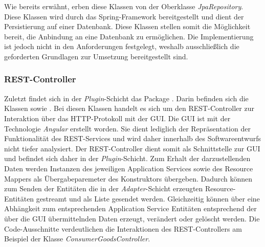Wie bereits erwähnt, erben diese Klassen von der Oberklasse \textit{JpaRepository}.
Diese Klassen wird durch das Spring-Framework bereitgestellt und dient der Persistierung auf einer Datenbank.
Diese Klassen stellen somit die Möglichkeit bereit, die Anbindung an eine Datenbank zu ermöglichen.
Die Implementierung ist jedoch nicht in den Anforderungen festgelegt, weshalb ausschließlich die geforderten Grundlagen zur Umsetzung bereitgestellt sind.

\subsubsection*{REST-Controller}
Zuletzt findet sich in der \textit{Plugin}-Schicht das Package \href{https://github.com/lucasmerkel/dhbw-advancedswe-programmentwurf/tree/main/swe_programmentwurf/consumergoods-inventory-planner/0-cip-plugins/src/main/java/de/dhbw/cip/plugins/rest}{}.
Darin befinden sich die Klassen \href{https://github.com/lucasmerkel/dhbw-advancedswe-programmentwurf/blob/d5c89113d12c3b877ddc4d6a99225b277ddd468f/swe_programmentwurf/consumergoods-inventory-planner/0-cip-plugins/src/main/java/de/dhbw/cip/plugins/rest/ConsumerGoodsGuiController.java}{} sowie \href{https://github.com/lucasmerkel/dhbw-advancedswe-programmentwurf/blob/d5c89113d12c3b877ddc4d6a99225b277ddd468f/swe_programmentwurf/consumergoods-inventory-planner/0-cip-plugins/src/main/java/de/dhbw/cip/plugins/rest/StorageGuiController.java}{}.
Bei diesen Klassen handelt es sich um den \ac{REST}-Controller zur Interaktion über das HTTP-Protokoll mit der \ac{GUI}.
Die GUI ist mit der Technologie \textit{Angular} erstellt worden.
Sie dient lediglich der Repräsentation der Funktionalität des \ac{REST}-Services und wird daher innerhalb des Softwareentwurfs nicht tiefer analysiert.
Der \ac{REST}-Controller dient somit als Schnittstelle zur \ac{GUI} und befindet sich daher in der \textit{Plugin}-Schicht.
Zum Erhalt der darzustellenden Daten werden Instanzen des jeweiligen Application Services sowie des Resource Mappers als Übergabeparemeter des Konstruktors übergeben.
Dadurch können zum Senden der Entitäten die in der \textit{Adapter}-Schicht erzeugten Resource-Entitäten gestreamt und als Liste gesendet werden.
Gleichzeitig können über eine Abhängkeit zum entsprechenden Application Service Entitäten entsprechend der über die \ac{GUI} übermittelnden Daten erzeugt, verändert oder gelöscht werden.
Die Code-Ausschnitte verdeutlichen die Interaktionen des \ac{REST}-Controllers am Beispiel der Klasse \textit{ConsumerGoodsController}.


